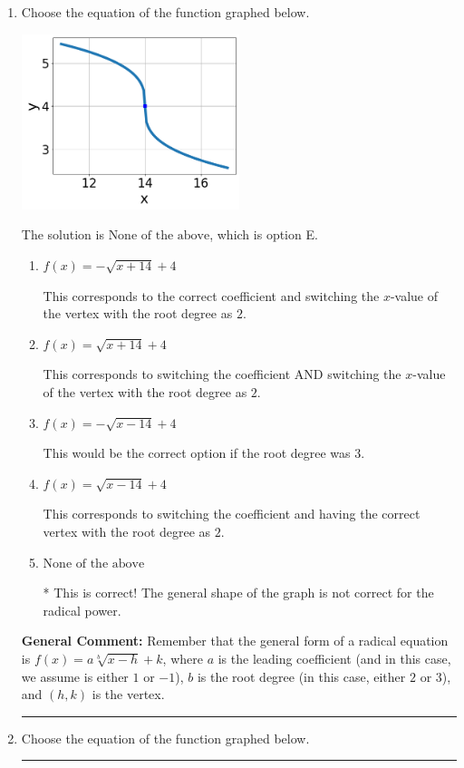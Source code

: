 \documentclass{extbook}[14pt]
\newcommand{\litem}[1]{\item #1

\rule{\textwidth}{0.4pt}}
\begin{document}
\begin{enumerate}\litem{
Choose the equation of the function graphed below.

\begin{center}
    \includegraphics[width=0.5\textwidth]{../Figures/radicalGraphToEquationA.png}
\end{center}


The solution is \( \text{None of the above} \), which is option E.\begin{enumerate}[label=\Alph*.]
\item \( f(x) = - \sqrt{x + 14} + 4 \)

This corresponds to the correct coefficient and switching the $x$-value of the vertex with the root degree as $2$.
\item \( f(x) = \sqrt{x + 14} + 4 \)

This corresponds to switching the coefficient AND switching the $x$-value of the vertex with the root degree as $2$.
\item \( f(x) = - \sqrt{x - 14} + 4 \)

This would be the correct option if the root degree was $3$.
\item \( f(x) = \sqrt{x - 14} + 4 \)

This corresponds to switching the coefficient and having the correct vertex with the root degree as $2$.
\item \( \text{None of the above} \)

* This is correct! The general shape of the graph is not correct for the radical power.
\end{enumerate}

\textbf{General Comment:} Remember that the general form of a radical equation is $ f(x) = a \sqrt[b]{x - h} + k$, where $a$ is the leading coefficient (and in this case, we assume is either $1$ or $-1$), $b$ is the root degree (in this case, either $2$ or $3$), and $(h, k)$ is the vertex.
}
\litem{
Choose the equation of the function graphed below.

}
\end{enumerate}
\end{document}
